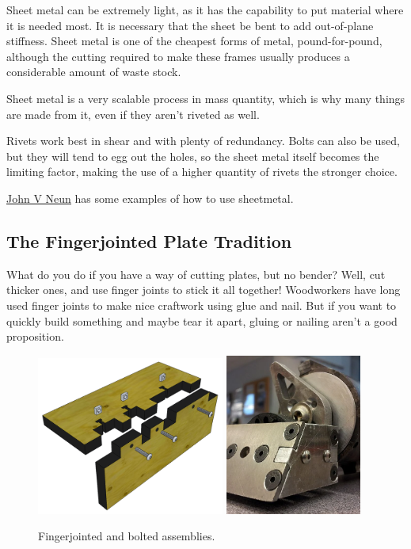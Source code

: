 	Sheet metal can be extremely light, as it has the capability to put material where it is needed most. It is necessary that the sheet be bent to add out-of-plane stiffness. Sheet metal is one of the cheapest forms of metal, pound-for-pound, although the cutting required to make these frames usually produces a considerable amount of waste stock. 
	
	Sheet metal is a very scalable process in mass quantity, which is why many things are made from it, even if they aren't riveted as well.
	
	Rivets work best in shear and with plenty of redundancy. Bolts can also be used, but they will tend to egg out the holes, so the sheet metal itself becomes the limiting factor, making the use of a higher quantity of rivets the stronger choice.
	
	\href{https://johnvneun.com/blog/2020/4/4/sheetmetal-design}{\color{red}\underline{John V Neun}} has some examples of how to use sheetmetal.
	
	\subsection{The Fingerjointed Plate Tradition}
	What do you do if you have a way of cutting plates, but no bender? Well, cut thicker ones, and use finger joints to stick it all together! Woodworkers have long used finger joints to make nice craftwork using glue and nail. But if you want to quickly build something and maybe tear it apart, gluing or nailing aren't a good proposition.
	
	\begin{figure}[H]
		\includegraphics[width=0.55\textwidth]{imgs/tradition_fingerjoint.png}
		\includegraphics[width=0.4\textwidth]{imgs/fingerjoint_battlebot.png}
		\caption{Fingerjointed and bolted assemblies.}
	\end{figure}
	
